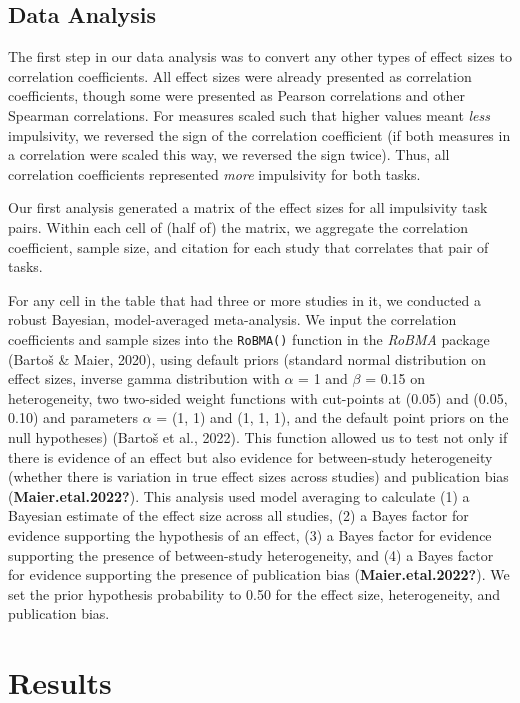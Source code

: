 \documentclass[
  ,pub,floatsintext]{apa6}
\begin{document}
\hypertarget{data-analysis}{%
\subsection{Data Analysis}\label{data-analysis}}

The first step in our data analysis was to convert any other types of effect sizes to correlation coefficients. All effect sizes were already presented as correlation coefficients, though some were presented as Pearson correlations and other Spearman correlations. For measures scaled such that higher values meant \emph{less} impulsivity, we reversed the sign of the correlation coefficient (if both measures in a correlation were scaled this way, we reversed the sign twice). Thus, all correlation coefficients represented \emph{more} impulsivity for both tasks.

Our first analysis generated a matrix of the effect sizes for all impulsivity task pairs. Within each cell of (half of) the matrix, we aggregate the correlation coefficient, sample size, and citation for each study that correlates that pair of tasks.

For any cell in the table that had three or more studies in it, we conducted a robust Bayesian, model-averaged meta-analysis. We input the correlation coefficients and sample sizes into the \texttt{RoBMA()} function in the \emph{RoBMA} package (Bartoš \& Maier, 2020), using default priors (standard normal distribution on effect sizes, inverse gamma distribution with \(\alpha\) = 1 and \(\beta\) = 0.15 on heterogeneity, two two-sided weight functions with cut-points at (0.05) and (0.05, 0.10) and parameters \(\alpha\) = (1, 1) and (1, 1, 1), and the default point priors on the null hypotheses) (Bartoš et al., 2022). This function allowed us to test not only if there is evidence of an effect but also evidence for between-study heterogeneity (whether there is variation in true effect sizes across studies) and publication bias (\textbf{Maier.etal.2022?}). This analysis used model averaging to calculate (1) a Bayesian estimate of the effect size across all studies, (2) a Bayes factor for evidence supporting the hypothesis of an effect, (3) a Bayes factor for evidence supporting the presence of between-study heterogeneity, and (4) a Bayes factor for evidence supporting the presence of publication bias (\textbf{Maier.etal.2022?}). We set the prior hypothesis probability to 0.50 for the effect size, heterogeneity, and publication bias.

\hypertarget{results}{%
\section{Results}\label{results}}
\end{document}
